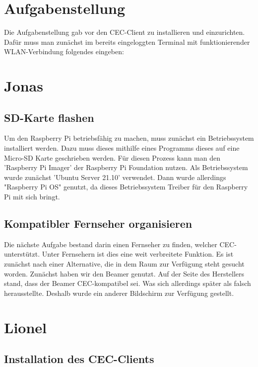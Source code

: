 \documentclass[a4paper]{article}
\begin{document}


\tableofcontents


\clearpage

\section{Aufgabenstellung}

Die Aufgabenstellung gab vor den CEC-Client zu installieren und einzurichten. Dafür muss man zunächst im bereits eingeloggten Terminal mit funktionierender WLAN-Verbindung folgendes eingeben:
\clearpage

\section{Jonas}
\subsection{SD-Karte flashen}
Um den Raspberry Pi betriebsfähig zu machen, muss zunächst ein Betriebssystem installiert werden. Dazu muss dieses mithilfe eines Programms dieses auf eine Micro-SD Karte geschrieben werden. Für diesen Prozess kann man den 'Raspberry Pi Imager' der Raspberry Pi Foundation nutzen. Als Betriebssystem wurde zunächst 'Ubuntu Server 21.10' verwendet. Dann wurde allerdings "Raspberry Pi OS" genutzt, da dieses Betriebssystem Treiber für den Raspberry Pi mit sich bringt.
\subsection{Kompatibler Fernseher organisieren}
Die nächste Aufgabe bestand darin einen Fernseher zu finden, welcher CEC-unterstützt. Unter Fernsehern ist dies eine weit verbreitete Funktion. Es ist zunächst nach einer Alternative, die in dem Raum zur Verfügung steht gesucht worden. Zunächst haben wir den Beamer genutzt.  Auf der Seite des Herstellers stand, dass der Beamer CEC-kompatibel sei. Was sich allerdings später als falsch herausstellte.
Deshalb wurde ein anderer Bildschirm zur Verfügung gestellt.
\clearpage

\section{Lionel}

\subsection{Installation des CEC-Clients}
\end{document}
